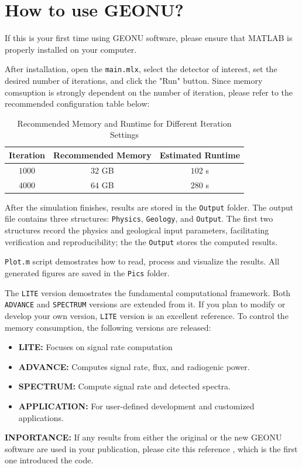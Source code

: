 		\section{How to use GEONU?}
			If this is your first time using GEONU software, please ensure that MATLAB is properly installed on your computer. \par
			After installation, open the \texttt{main.mlx}, select the detector of interest, set the desired number of iterations, and click the "Run" button. Since memory comsuption is strongly dependent on the number of iteration, please refer to the recommended configuration table below:
				\begin{table}[H]
					\centering
					\caption{Recommended Memory and Runtime for Different Iteration Settings}
					\begin{tabular}{|c|c|c|}
						\hline
						Iteration & Recommended Memory & Estimated Runtime\\
						\hline
						$1000$ & $32$ GB & $102$ s\\
						\hline
						$4000$ & $64$ GB & $280$ s\\
						\hline
					\end{tabular}
				\end{table}
			After the simulation finishes, results are stored in the \texttt{Output} folder. The output file contains three structures: \texttt{Physics}, \texttt{Geology}, and \texttt{Output}. The first two structures record the physics and geological input parameters, facilitating verification and reproducibility; the the \texttt{Output} stores the computed results. \par
			\texttt{Plot.m} script demostrates how to read, process and visualize the results. All generated figures are saved in the \texttt{Pics} folder.\par
			The \texttt{LITE} version demostrates the fundamental computational framework. Both \texttt{ADVANCE} and \texttt{SPECTRUM} versions are extended from it. If you plan to modify or develop your own version, \texttt{LITE} version is an excellent reference. To control the memory consumption, the following versions are released:
				\begin{itemize}
					\item \textbf{LITE:} Focuses on signal rate computation
					\item \textbf{ADVANCE:} Computes signal rate, flux, and radiogenic power.
					\item \textbf{SPECTRUM:} Compute signal rate and detected spectra.
					\item \textbf{APPLICATION:} For user-defined development and customized applications.
				\end{itemize}
			{\color{red} \textbf{INPORTANCE:} If any results from either the original or the new GEONU software are used in your publication, please cite this reference \cite{wipperfurth2020reference}, which is the first one introduced the code.}
